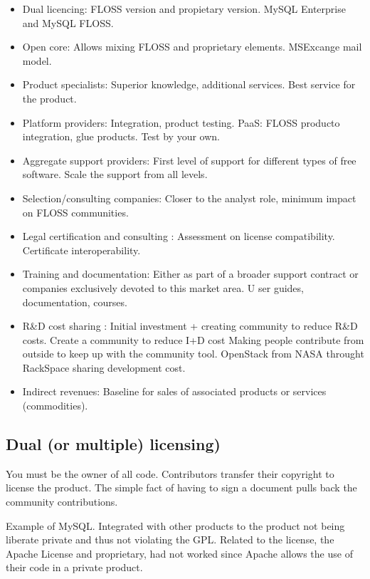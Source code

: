 \begin{itemize}
    \item Dual licencing: FLOSS version and propietary version. 
    MySQL Enterprise and MySQL FLOSS.
    \item Open core: Allows mixing FLOSS and proprietary elements. 
    MSExcange mail model.
    \item Product specialists: Superior knowledge, additional services. 
    Best service for the product.
    \item Platform providers: Integration, product testing. 
    PaaS: FLOSS producto integration, glue products. Test by your own.
    \item Aggregate support providers: 
    First level of support for different types of free software. 
    Scale the support from all levels.
    \item Selection/consulting companies: Closer to the analyst role, 
    minimum impact on FLOSS communities.
    \item Legal certification and consulting : Assessment on license 
    compatibility. Certificate interoperability.
    \item Training and documentation: Either as part of a broader support 
    contract or companies exclusively devoted to this market area. U
    ser guides, documentation, courses.
    \item R\&D cost sharing : Initial investment + creating community to 
    reduce R\&D costs. Create a community to reduce I+D cost
    Making people contribute from outside to keep up with the community tool.
    OpenStack from NASA throught RackSpace sharing development cost.
    \item Indirect revenues: Baseline for sales of associated products or 
    services (commodities).
\end{itemize}

\subsection{Dual (or multiple) licensing)}

You must be the owner of all code. Contributors transfer their copyright to
license the product. The simple fact of having to sign a document pulls back 
the community contributions.

Example of MySQL.
Integrated with other products to the product not being liberate private and 
thus not violating the GPL.
Related to the license, the Apache License and proprietary, had not worked 
since Apache allows the use of their code in a private product.

